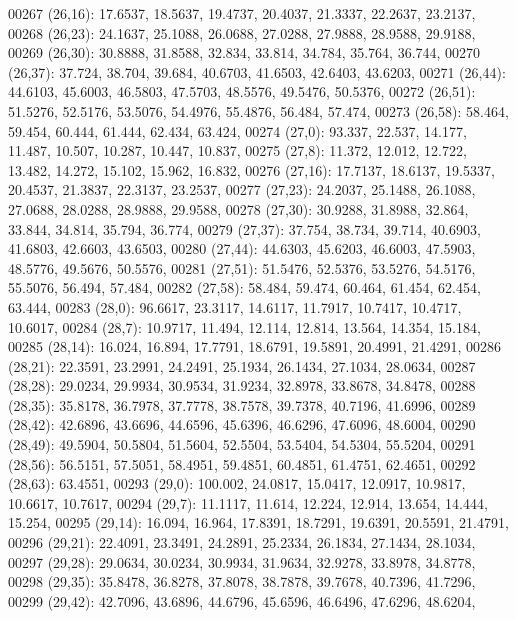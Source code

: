 \begin{DoxyCode}
00267       (26,16): 17.6537, 18.5637, 19.4737, 20.4037, 21.3337, 22.2637, 23.2137,
00268       (26,23): 24.1637, 25.1088, 26.0688, 27.0288, 27.9888, 28.9588, 29.9188,
00269       (26,30): 30.8888, 31.8588, 32.834, 33.814, 34.784, 35.764, 36.744,
00270       (26,37): 37.724, 38.704, 39.684, 40.6703, 41.6503, 42.6403, 43.6203,
00271       (26,44): 44.6103, 45.6003, 46.5803, 47.5703, 48.5576, 49.5476, 50.5376,
00272       (26,51): 51.5276, 52.5176, 53.5076, 54.4976, 55.4876, 56.484, 57.474,
00273       (26,58): 58.464, 59.454, 60.444, 61.444, 62.434, 63.424,
00274       (27,0): 93.337, 22.537, 14.177, 11.487, 10.507, 10.287, 10.447, 10.837,
00275       (27,8): 11.372, 12.012, 12.722, 13.482, 14.272, 15.102, 15.962, 16.832,
00276       (27,16): 17.7137, 18.6137, 19.5337, 20.4537, 21.3837, 22.3137, 23.2537,
00277       (27,23): 24.2037, 25.1488, 26.1088, 27.0688, 28.0288, 28.9888, 29.9588,
00278       (27,30): 30.9288, 31.8988, 32.864, 33.844, 34.814, 35.794, 36.774,
00279       (27,37): 37.754, 38.734, 39.714, 40.6903, 41.6803, 42.6603, 43.6503,
00280       (27,44): 44.6303, 45.6203, 46.6003, 47.5903, 48.5776, 49.5676, 50.5576,
00281       (27,51): 51.5476, 52.5376, 53.5276, 54.5176, 55.5076, 56.494, 57.484,
00282       (27,58): 58.484, 59.474, 60.464, 61.454, 62.454, 63.444,
00283       (28,0): 96.6617, 23.3117, 14.6117, 11.7917, 10.7417, 10.4717, 10.6017,
00284       (28,7): 10.9717, 11.494, 12.114, 12.814, 13.564, 14.354, 15.184,
00285       (28,14): 16.024, 16.894, 17.7791, 18.6791, 19.5891, 20.4991, 21.4291,
00286       (28,21): 22.3591, 23.2991, 24.2491, 25.1934, 26.1434, 27.1034, 28.0634,
00287       (28,28): 29.0234, 29.9934, 30.9534, 31.9234, 32.8978, 33.8678, 34.8478,
00288       (28,35): 35.8178, 36.7978, 37.7778, 38.7578, 39.7378, 40.7196, 41.6996,
00289       (28,42): 42.6896, 43.6696, 44.6596, 45.6396, 46.6296, 47.6096, 48.6004,
00290       (28,49): 49.5904, 50.5804, 51.5604, 52.5504, 53.5404, 54.5304, 55.5204,
00291       (28,56): 56.5151, 57.5051, 58.4951, 59.4851, 60.4851, 61.4751, 62.4651,
00292       (28,63): 63.4551,
00293       (29,0): 100.002, 24.0817, 15.0417, 12.0917, 10.9817, 10.6617, 10.7617,
00294       (29,7): 11.1117, 11.614, 12.224, 12.914, 13.654, 14.444, 15.254,
00295       (29,14): 16.094, 16.964, 17.8391, 18.7291, 19.6391, 20.5591, 21.4791,
00296       (29,21): 22.4091, 23.3491, 24.2891, 25.2334, 26.1834, 27.1434, 28.1034,
00297       (29,28): 29.0634, 30.0234, 30.9934, 31.9634, 32.9278, 33.8978, 34.8778,
00298       (29,35): 35.8478, 36.8278, 37.8078, 38.7878, 39.7678, 40.7396, 41.7296,
00299       (29,42): 42.7096, 43.6896, 44.6796, 45.6596, 46.6496, 47.6296, 48.6204,

\end{DoxyCode}
